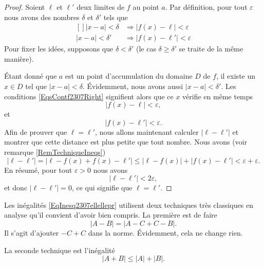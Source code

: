 \begin{proof}
	Soient $\ell$ et $\ell'$ deux limites de $f$ au point $a$. Par définition, pour tout $\varepsilon$ nous avons des nombres $\delta$ et $\delta'$ tels que
	\begin{equation}	\label{EqsContf2307Right}
		\begin{aligned}[]
			| x-a |<\delta&\Rightarrow \big| f(x)-\ell \big|<\varepsilon\\
			| x-a |<\delta'&\Rightarrow \big| f(x)-\ell' \big|<\varepsilon
		\end{aligned}
	\end{equation}
	Pour fixer les idées, supposons que $\delta<\delta'$ (le cas $\delta\geq\delta'$ se traite de la même manière).

	Étant donné que $a$ est un point d'accumulation du domaine $D$ de $f$, il existe un $x\in D$ tel que $| x-a |<\delta$. Évidemment, nous avons aussi $| x-a |<\delta'$. Les conditions \eqref{EqsContf2307Right} signifient alors que ce $x$ vérifie en même temps
	\begin{equation}
		| f(x)-\ell |<\varepsilon,
	\end{equation}
	et
	\begin{equation}
		| f(x)-\ell' |<\varepsilon.
	\end{equation}
	Afin de prouver que $\ell=\ell'$, nous allons maintenant calculer $| \ell-\ell' |$ et montrer que cette distance est plus petite que tout nombre. Nous avons (voir remarque \ref{RemTechniqueIneqs})
	\begin{equation}	\label{EqInesq2307ellellepr}
		| \ell-\ell' |=| \ell-f(x)+f(x)-\ell' |\leq | \ell-f(x) |+| f(x)-\ell' |<\varepsilon+\varepsilon.
	\end{equation}
	En résumé, pour tout $\varepsilon>0$ nous avons
	\begin{equation}
		| \ell-\ell' |<2\varepsilon,
	\end{equation}
	et donc $| \ell-\ell' |=0$, ce qui signifie que $\ell=\ell'$.
\end{proof}

\begin{remark}		\label{RemTechniqueIneqs}
	Les inégalités \eqref{EqInesq2307ellellepr} utilisent deux techniques très classiques en analyse qu'il convient d'avoir bien compris. La première est de faire
	\begin{equation}
		| A-B |=| A-C+C-B |.
	\end{equation}
	Il s'agit d'ajouter $-C+C$ dans la norme. Évidemment, cela ne change rien.

	La seconde technique est l'inégalité
	\begin{equation}
		| A+B |\leq| A |+| B |.
	\end{equation}
\end{remark}

